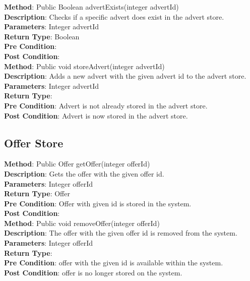 \documentclass{l3deliverable}
\begin{document}
\textbf{Method}: Public Boolean advertExists(integer advertId)\\
\textbf{Description}: Checks if a specific advert does exist in the advert store.\\
\textbf{Parameters}: Integer advertId\\
\textbf{Return Type}: Boolean\\
\textbf{Pre Condition}:\\
\textbf{Post Condition}:\\

\textbf{Method}: Public void storeAdvert(integer advertId)\\
\textbf{Description}: Adds a new advert with the given advert id to the advert store. \\
\textbf{Parameters}: Integer advertId\\
\textbf{Return Type}: \\
\textbf{Pre Condition}: Advert is not already stored in the advert store.\\
\textbf{Post Condition}: Advert is now stored in the advert store.\\

\subsection{Offer Store}

\textbf{Method}: Public Offer getOffer(integer offerId)\\ 
\textbf{Description}: Gets the offer with the given offer id. \\
\textbf{Parameters}: Integer offerId\\
\textbf{Return Type}: Offer\\
\textbf{Pre Condition}: Offer with given id is stored in the system.\\
\textbf{Post Condition}:\\

\textbf{Method}: Public void removeOffer(integer offerId)\\
\textbf{Description}: The offer with the given offer id is removed from the system. \\
\textbf{Parameters}: Integer offerId \\
\textbf{Return Type}:\\
\textbf{Pre Condition}: offer with the given id is available within the system.\\
\textbf{Post Condition}: offer is no longer stored on the system.\\
\end{document}

